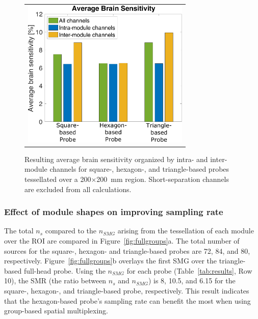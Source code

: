 \begin{figure}
    \begin{center}
    \begin{tabular}{c}
    \includegraphics[width=8cm]{fig/moca/Fig_6.pdf}
    \end{tabular}
    \end{center}
    \caption {Resulting average brain sensitivity organized by intra- and inter-module channels for square-, hexagon-, and triangle-based probes tessellated over a 200$\times$200~mm region. Short-separation channels are excluded from all calculations.} 
    \label{fig:fullbrainsensitivity}
\end{figure} 


\subsubsection{Effect of module shapes on improving sampling rate}
The total $n_s$ compared to the $n_{SMG}$ arising from the tessellation of each module over the \ac{ROI} are compared in Figure~\ref{fig:fullgroups}a. The total number of sources for the square-, hexagon- and triangle-based probes are 72, 84, and 80, respectively. Figure~\ref{fig:fullgroups}b overlays the first \ac{SMG} over the triangle-based full-head probe. Using the $n_{SMG}$ for each probe (Table~\ref{tab:results}, Row 10), the \ac{SMR} (the ratio between $n_s$ and $n_{SMG}$) is 8, 10.5, and 6.15 for the square-, hexagon-, and triangle-based probe, respectively. This result indicates that the hexagon-based probe's sampling rate can benefit the most when using  group-based spatial multiplexing.

